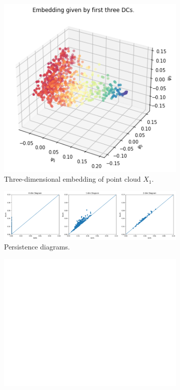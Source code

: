 \begin{figure}[H]
\centering
\begin{subfigure}[b]{0.2\textwidth}
    \includegraphics[width=\textwidth]{figures/X1_embedding.png}
    \caption{Three-dimensional embedding of point cloud $X_1$.}
\end{subfigure}
\hfill
\begin{subfigure}[b]{0.75\textwidth}
    \includegraphics[width=\textwidth]{figures/X1_H0.png}
    \caption*{Persistence diagrams.}
\end{subfigure}
\begin{subfigure}[b]{0.25\textwidth}
\includegraphics[width=\textwidth]{figures/white.png} 

\end{subfigure}
\end{figure}
